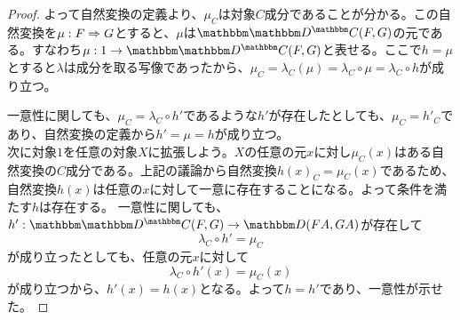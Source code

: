 \begin{proof}
  よって自然変換の定義より、$\mu_C$は対象$C$成分であることが分かる。この自然変換を$\mu:F\Rightarrow G$とすると、$\mu$は$\arset{\funccat{C}{D}}{F}{G}$の元である。すなわち$\mor{\mu}{1}{\arset{\funccat{C}{D}}{F}{G}}$と表せる。ここで$h=\mu$とすると$\lambda$は成分を取る写像であったから、$\mu_C=\lambda_C(\mu)=\lambda_C\circ\mu=\lambda_C\circ h$が成り立つ。
  \begin{center}
  \end{center}
  一意性に関しても、$\mu_C=\lambda_C\circ h'$であるような$h'$が存在したとしても、$\mu_C={h'}_C$であり、自然変換の定義から$h'=\mu=h$が成り立つ。\\
  次に対象$1$を任意の対象$X$に拡張しよう。$X$の任意の元$x$に対し$\mu_C(x)$はある自然変換の$C$成分である。上記の議論から自然変換$h(x)_C=\mu_C(x)$であるため、自然変換$h(x)$は任意の$x$に対して一意に存在することになる。よって条件を満たす$h$は存在する。
  一意性に関しても、$\mor{h'}{\arset{\funccat{C}{D}}{F}{G}}{\arset{D}{FA}{GA}}$が存在して\[\lambda_C\circ h' = \mu_C\]が成り立ったとしても、任意の元$x$に対して\[\lambda_C\circ h'(x) = \mu_C(x)\]が成り立つから、$h'(x)=h(x)$となる。よって$h = h'$であり、一意性が示せた。


\end{proof}
